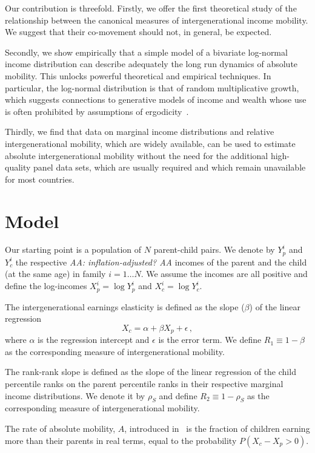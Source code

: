 \documentclass[12pt,a4paper]{article}
\newcommand{\red}[1]{{\color{red} #1}}
\newcommand{\AAA}[1]{\red{{\it AA: #1 AA}}}
\newcommand{\be}{\begin{equation}}
\newcommand{\ee}{\end{equation}}
\numberwithin{equation}{section}
\begin{document}
Our contribution is threefold. Firstly, we offer the first theoretical study of the relationship between the canonical measures of intergenerational income mobility. We suggest that their co-movement should not, in general, be expected.

Secondly, we show empirically that a simple model of a bivariate log-normal income distribution can describe adequately the long run dynamics of absolute mobility. This unlocks powerful theoretical and empirical techniques. In particular, the log-normal distribution is that of random multiplicative growth, which suggests connections to generative models of income and wealth whose use is often prohibited by assumptions of ergodicity~\citep{adamou2016,berman2016far}.

Thirdly, we find that data on marginal income distributions and relative intergenerational mobility, which are widely available, can be used to estimate absolute intergenerational mobility without the need for the additional high-quality panel data sets, which are usually required and which remain unavailable for most countries.

\section{Model}

Our starting point is a population of $N$ parent-child pairs. We denote by $Y_p^i$ and $Y_c^i$ the respective \AAA{inflation-adjusted?} incomes of the parent and the child (at the same age) in family $i=1\dots N$. We assume the incomes are all positive and define the log-incomes $X_p^i=\log Y_p^i$ and $X_c^i=\log Y_c^i$.

The intergenerational earnings elasticity is defined as the slope ($\beta$) of the linear regression
\be
X_c = \alpha + \beta X_p + \epsilon\,,
\ee
where $\alpha$ is the regression intercept and $\epsilon$ is the error term. We define $R_1\equiv 1- \beta$ as the corresponding measure of intergenerational mobility.

The rank-rank slope
is defined as the slope of the linear regression of the child percentile ranks on the parent percentile ranks in their respective marginal income distributions. We denote it by $\rho_S$ and define $R_2\equiv 1- \rho_S$ as the corresponding measure of intergenerational mobility.

The rate of absolute mobility, $A$, introduced in~\citep[p.~1563]{chetty2014land} is the fraction of children earning more than their parents in real terms, equal to the probability $P\left(X_c-X_p > 0\right)$.
\end{document}
